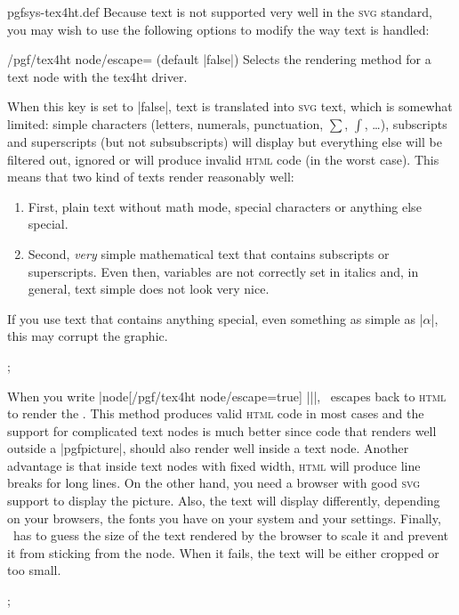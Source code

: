 \begin{filedescription}{pgfsys-tex4ht.def}
    Because text is not supported very well in the \textsc{svg} standard, you
    may wish to use the following options to modify the way text is handled:

    \begin{key}{/pgf/tex4ht node/escape= (default |false|)}
        Selects the rendering method for a text node with the tex4ht driver.

        When this key is set to |false|, text is translated into \textsc{svg}
        text, which is somewhat limited: simple characters (letters, numerals,
        punctuation, $\sum$, $\int$, \ldots), subscripts and superscripts (but
        not subsubscripts) will display but everything else will be filtered
        out, ignored or will produce invalid \textsc{html} code (in the worst
        case). This means that two kind of texts render reasonably well:
        \begin{enumerate}
            \item First, plain text without math mode, special characters or
                anything else special.
            \item Second, \emph{very} simple mathematical text that contains
                subscripts or superscripts. Even then, variables are not
                correctly set in italics and, in general, text simple does
                not look very nice.
        \end{enumerate}
        If you use text that contains anything special, even something as
        simple as |$\alpha$|, this may corrupt the graphic.
\begin{codeexample}
\tikz {};
\end{codeexample}

    When you write |node[/pgf/tex4ht node/escape=true] {||}|,
    \pgfname\ escapes back to \textsc{html} to render the . This
    method produces valid \textsc{html} code in most cases and the support for
    complicated text nodes is much better since code that renders well outside
    a |{pgfpicture}|, should also render well inside a text node. Another
    advantage is that inside text nodes with fixed width, \textsc{html} will
    produce line breaks for long  lines. On the other hand, you need a browser
    with good \textsc{svg} support to display the picture. Also, the text will
    display differently, depending on your browsers, the fonts you have on your
    system and your settings. Finally, \pgfname\ has to guess the size of the
    text rendered by the browser to scale it and prevent it from sticking from
    the node. When it fails, the text will be either cropped or too small.
\begin{codeexample}
\tikz {};
\end{codeexample}
    \end{key}


\end{filedescription}
